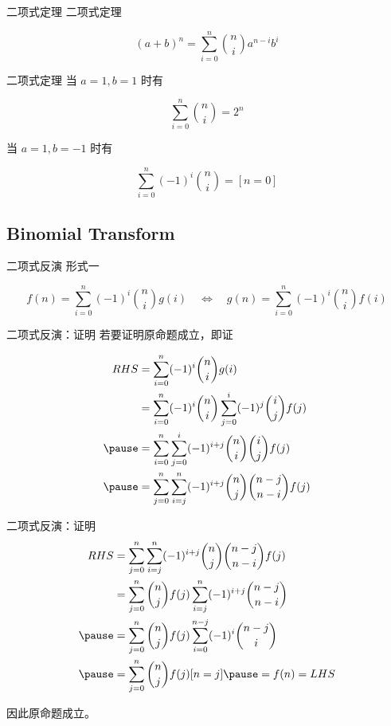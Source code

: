 \documentclass[12pt,aspectratio=169]{beamer}
\begin{document}
\begin{frame}[fragile]{二项式定理}
二项式定理

$$
(a+b)^n = \sum_{i=0}^{n} {n \choose i} a^{n-i} b^{i}
$$
\end{frame}

\begin{frame}[fragile]{二项式定理}
当 $a=1, b=1$ 时有

$$
\sum_{i=0}^{n} {n \choose i} = 2^n
$$

当 $a=1, b=-1$ 时有

$$
\sum_{i=0}^{n} (-1)^i {n \choose i} = [n = 0]
$$
\end{frame}

\subsection[二项式反演]{Binomial Transform}

\begin{frame}[fragile]{二项式反演}
形式一

$$
f(n) = \sum_{i=0}^{n} (-1)^i {n \choose i} g(i)
\quad \Longleftrightarrow \quad
g(n) = \sum_{i=0}^{n} (-1)^i {n \choose i} f(i)
$$
\end{frame}

\begin{frame}[fragile]{二项式反演：证明}
若要证明原命题成立，即证

$$
\begin{aligned}
  RHS  &= \sum_{i=0}^{n} (-1)^i {n \choose i} g(i) \\
       &= \sum_{i=0}^{n} (-1)^i {n \choose i} \sum_{j=0}^{i} (-1)^j {i \choose j} f(j) \\ \pause
       &= \sum_{i=0}^{n} \sum_{j=0}^{i} (-1)^{i+j} {n \choose i} {i \choose j} f(j) \\ \pause
       &= \sum_{j=0}^{n} \sum_{i=j}^{n} (-1)^{i+j} {n \choose j} {n - j \choose n - i} f(j)
\end{aligned}
$$
\end{frame}

\begin{frame}[fragile]{二项式反演：证明}
$$
\begin{aligned}
  RHS  &= \sum_{j=0}^{n} \sum_{i=j}^{n} (-1)^{i+j} {n \choose j} {n - j \choose n - i} f(j) \\
       &= \sum_{j=0}^{n} {n \choose j} f(j) \sum_{i=j}^{n} (-1)^{i+j} {n - j \choose n - i} \\ \pause
       &= \sum_{j=0}^{n} {n \choose j} f(j) \sum_{i=0}^{n-j} (-1)^{i} {n - j \choose i} \\ \pause
       &= \sum_{j=0}^{n} {n \choose j} f(j) [n = j] \pause = f(n) = LHS
\end{aligned}
$$

因此原命题成立。
\end{frame}
\end{document}
